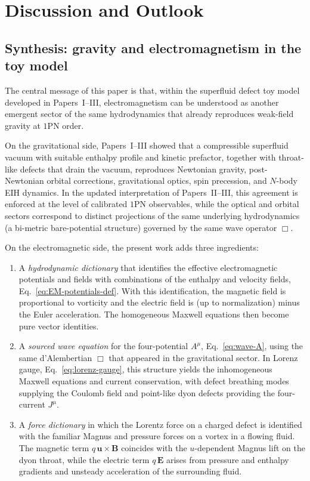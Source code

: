 \documentclass[11pt]{article}
\begin{document}
\section{Discussion and Outlook}
\label{sec:discussion}

\subsection{Synthesis: gravity and electromagnetism in the toy model}

The central message of this paper is that, within the superfluid defect toy model developed in Papers~I--III, electromagnetism can be understood as another emergent sector of the same hydrodynamics that already reproduces weak-field gravity at $1$PN order.

On the gravitational side, Papers~I--III showed that a compressible superfluid vacuum with suitable enthalpy profile and kinetic prefactor, together with throat-like defects that drain the vacuum, reproduces Newtonian gravity, post-Newtonian orbital corrections, gravitational optics, spin precession, and $N$-body EIH dynamics.  In the updated interpretation of Papers~II--III, this agreement is enforced at the level of calibrated $1$PN observables, while the optical and orbital sectors correspond to distinct projections of the same underlying hydrodynamics (a bi-metric bare-potential structure) governed by the same wave operator $\Box$.

On the electromagnetic side, the present work adds three ingredients:
\begin{enumerate}
  \item A \emph{hydrodynamic dictionary} that identifies the effective electromagnetic potentials and fields with combinations of the enthalpy and velocity fields, Eq.~\eqref{eq:EM-potentials-def}.  With this identification, the magnetic field is proportional to vorticity and the electric field is (up to normalization) minus the Euler acceleration.  The homogeneous Maxwell equations then become pure vector identities.

  \item A \emph{sourced wave equation} for the four-potential $A^\mu$, Eq.~\eqref{eq:wave-A}, using the same d'Alembertian $\Box$ that appeared in the gravitational sector.  In Lorenz gauge, Eq.~\eqref{eq:lorenz-gauge}, this structure yields the inhomogeneous Maxwell equations and current conservation, with defect breathing modes supplying the Coulomb field and point-like dyon defects providing the four-current $J^\mu$.

  \item A \emph{force dictionary} in which the Lorentz force on a charged defect is identified with the familiar Magnus and pressure forces on a vortex in a flowing fluid.  The magnetic term $q\,\mathbf{u}\times\mathbf{B}$ coincides with the $u$-dependent Magnus lift on the dyon throat, while the electric term $q\,\mathbf{E}$ arises from pressure and enthalpy gradients and unsteady acceleration of the surrounding fluid.
\end{enumerate}
\end{document}
